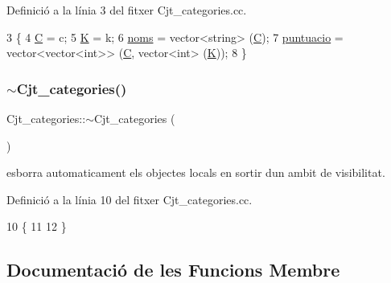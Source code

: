 Definició a la línia 3 del fitxer Cjt\+\_\+categories.\+cc.


\begin{DoxyCode}
3                                            \{
4     \mbox{\hyperlink{class_cjt__categories_a1d3d6eb2bd5a981ca1e56d4d16e7d1c1}{C}} = c;
5     \mbox{\hyperlink{class_cjt__categories_a3e7981c4f9b0aa3e0d5999ffa291ce54}{K}} = k;
6     \mbox{\hyperlink{class_cjt__categories_a45622c30fae365dc72f2d7aa5fbc3bfc}{noms}} = vector<string> (\mbox{\hyperlink{class_cjt__categories_a1d3d6eb2bd5a981ca1e56d4d16e7d1c1}{C}});
7     \mbox{\hyperlink{class_cjt__categories_a121b331af19b7307f320b21f0edd8b30}{puntuacio}} = vector<vector<int>> (\mbox{\hyperlink{class_cjt__categories_a1d3d6eb2bd5a981ca1e56d4d16e7d1c1}{C}}, vector<int> (\mbox{\hyperlink{class_cjt__categories_a3e7981c4f9b0aa3e0d5999ffa291ce54}{K}}));
8 \}
\end{DoxyCode}
\mbox{\label{class_cjt__categories_a768f340b8389161d8dc565ecf8853f4f}} 
\subsubsection{\texorpdfstring{$\sim$\+Cjt\+\_\+categories()}{~Cjt\_categories()}}
{\footnotesize\ttfamily Cjt\+\_\+categories\+::$\sim$\+Cjt\+\_\+categories (\begin{DoxyParamCaption}{ }\end{DoxyParamCaption})}



esborra automaticament els objectes locals en sortir d\textquotesingle{}un ambit de visibilitat. 



Definició a la línia 10 del fitxer Cjt\+\_\+categories.\+cc.


\begin{DoxyCode}
10                                 \{
11     
12 \}
\end{DoxyCode}


\subsection{Documentació de les Funcions Membre}
\mbox{\label{class_cjt__categories_aec7c99f38b0e4a59e804b5bf9ed1a4c8}} 
